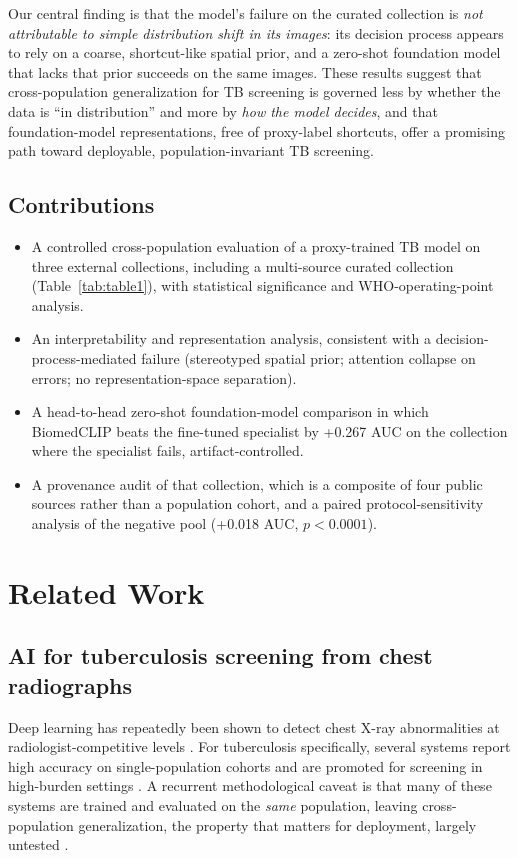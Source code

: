 \documentclass[runningheads]{llncs}
\begin{document}
Our central finding is that the model's failure on the curated collection is \emph{not attributable to simple distribution shift in its images}: its decision process appears to rely on a coarse, shortcut-like spatial prior, and a zero-shot foundation model that lacks that prior succeeds on the same images. These results suggest that cross-population generalization for TB screening is governed less by whether the data is ``in distribution'' and more by \emph{how the model decides}, and that foundation-model representations, free of proxy-label shortcuts, offer a promising path toward deployable, population-invariant TB screening.

\subsection*{Contributions}
\begin{itemize}
\item A controlled cross-population evaluation of a proxy-trained TB model on three external collections, including a multi-source curated collection (Table~\ref{tab:table1}), with statistical significance and WHO-operating-point analysis.
\item An interpretability and representation analysis, consistent with a decision-process-mediated failure (stereotyped spatial prior; attention collapse on errors; no representation-space separation).
\item A head-to-head zero-shot foundation-model comparison in which BiomedCLIP beats the fine-tuned specialist by +0.267 AUC on the collection where the specialist fails, artifact-controlled.
\item A provenance audit of that collection, which is a composite of four public sources rather than a population cohort, and a paired protocol-sensitivity analysis of the negative pool (+0.018 AUC, $p<0.0001$).
\end{itemize}

\section{Related Work}
\subsection{AI for tuberculosis screening from chest radiographs}
Deep learning has repeatedly been shown to detect chest X-ray abnormalities at radiologist-competitive levels \cite{rajpurkar2017,irvin2019,wang2017}. For tuberculosis specifically, several systems report high accuracy on single-population cohorts and are promoted for screening in high-burden settings \cite{murphy2020}. A recurrent methodological caveat is that many of these systems are trained and evaluated on the \emph{same} population, leaving cross-population generalization, the property that matters for deployment, largely untested \cite{rajpurkar2020}.
\end{document}
